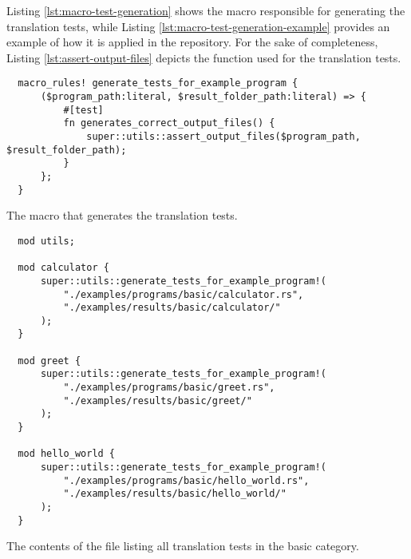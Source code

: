 Listing \ref{lst:macro-test-generation} shows the macro responsible for generating the translation tests,
while Listing \ref{lst:macro-test-generation-example} provides an example of how it is applied
in the repository. For the sake of completeness, Listing \ref{lst:assert-output-files}
depicts the function used for the translation tests.

\begin{listing}[!htbp]
  \begin{verbatim}
  macro_rules! generate_tests_for_example_program {
      ($program_path:literal, $result_folder_path:literal) => {
          #[test]
          fn generates_correct_output_files() {
              super::utils::assert_output_files($program_path, $result_folder_path);
          }
      };
  }        
  \end{verbatim}
  \caption{The macro that generates the translation tests.}
  \label{lst:macro-test-generation}
\end{listing}


\begin{listing}[!htbp]
  \begin{verbatim}
  mod utils;
  
  mod calculator {
      super::utils::generate_tests_for_example_program!(
          "./examples/programs/basic/calculator.rs",
          "./examples/results/basic/calculator/"
      );
  }
  
  mod greet {
      super::utils::generate_tests_for_example_program!(
          "./examples/programs/basic/greet.rs",
          "./examples/results/basic/greet/"
      );
  }
  
  mod hello_world {
      super::utils::generate_tests_for_example_program!(
          "./examples/programs/basic/hello_world.rs",
          "./examples/results/basic/hello_world/"
      );
  }    
  \end{verbatim}
  \caption{The contents of the file  listing all translation tests in the basic category.}
  \label{lst:macro-test-generation-example}
\end{listing}

